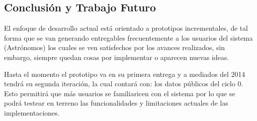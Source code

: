 \subsection{Conclusión y Trabajo Futuro}
El enfoque de desarrollo actual está orientado a prototipos incrementales, de
tal forma que se van generando entregables frecuentemente a los usuarios del
sistema (Astrónomos) los cuales se ven satisfechos por los avances realizados,
sin embargo, siempre quedan cosas por implementar o aparecen nuevas ideas.

Hasta el momento el prototipo va en su primera entrega y a mediados del 2014
tendrá su segunda iteración, la cual contará con: los datos públicos del ciclo
0. Esto permitirá que más usuarios se familiaricen con el sistema por lo que se
podrá testear en terreno las funcionalidades y limitaciones actuales de las
implementaciones.
